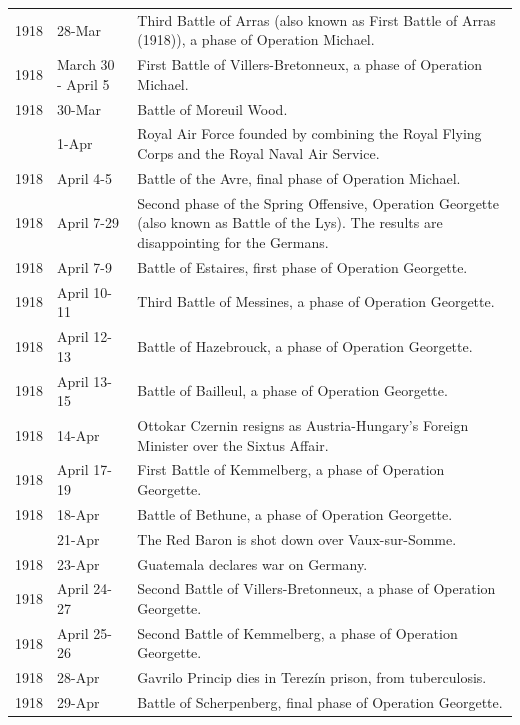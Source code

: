 \documentclass[
  openany]{book}
\begin{document}
\begin{longtable}[t]{rl>{\raggedright\arraybackslash}p{22em}}
\rowcolor{gray!6}  1918 & 28-Mar & Third Battle of Arras (also known as First Battle of Arras (1918)), a phase of Operation Michael.\\
1918 & March 30 - April 5 & First Battle of Villers-Bretonneux, a phase of Operation Michael.\\
\rowcolor{gray!6}  1918 & 30-Mar & Battle of Moreuil Wood.\\
\addlinespace
1918 & 1-Apr & Royal Air Force founded by combining the Royal Flying Corps and the Royal Naval Air Service.\\
\rowcolor{gray!6}  1918 & April 4-5 & Battle of the Avre, final phase of Operation Michael.\\
1918 & April 7-29 & Second phase of the Spring Offensive, Operation Georgette (also known as Battle of the Lys). The results are disappointing for the Germans.\\
\rowcolor{gray!6}  1918 & April 7-9 & Battle of Estaires, first phase of Operation Georgette.\\
1918 & April 10-11 & Third Battle of Messines, a phase of Operation Georgette.\\
\addlinespace
\rowcolor{gray!6}  1918 & April 12-13 & Battle of Hazebrouck, a phase of Operation Georgette.\\
1918 & April 13-15 & Battle of Bailleul, a phase of Operation Georgette.\\
\rowcolor{gray!6}  1918 & 14-Apr & Ottokar Czernin resigns as Austria-Hungary's Foreign Minister over the Sixtus Affair.\\
1918 & April 17-19 & First Battle of Kemmelberg, a phase of Operation Georgette.\\
\rowcolor{gray!6}  1918 & 18-Apr & Battle of Bethune, a phase of Operation Georgette.\\
\addlinespace
1918 & 21-Apr & The Red Baron is shot down over Vaux-sur-Somme.\\
\rowcolor{gray!6}  1918 & 23-Apr & Guatemala declares war on Germany.\\
1918 & April 24-27 & Second Battle of Villers-Bretonneux, a phase of Operation Georgette.\\
\rowcolor{gray!6}  1918 & April 25-26 & Second Battle of Kemmelberg, a phase of Operation Georgette.\\
1918 & 28-Apr & Gavrilo Princip dies in Terezín prison, from tuberculosis.\\
\addlinespace
\rowcolor{gray!6}  1918 & 29-Apr & Battle of Scherpenberg, final phase of Operation Georgette.\\

\end{longtable}
\end{document}
